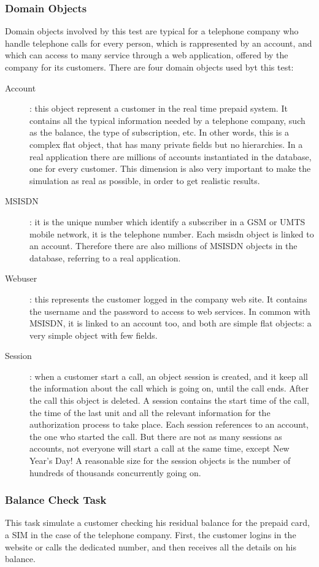 			\subsubsection{Domain Objects}
Domain objects involved by this test are typical for a telephone company who handle telephone calls for every person, which is rappresented by an account, and which can access to many service through a web application, offered by the company for its customers. There are four domain objects used byt this test:
\begin{description}
	\item[Account]: this object represent a customer in the real time prepaid system. It contains all the typical information needed by a telephone company, such as the balance, the type of subscription, etc. In other words, this is a complex flat object, that has many private fields but no hierarchies. In a real application there are millions of accounts instantiated in the database, one for every customer. This dimension is also very important to make the simulation as real as possible, in order to get realistic results.
	\item[MSISDN]: it is the unique number which identify a subscriber in a GSM or UMTS mobile network, it is the telephone number. Each msisdn object is linked to an account. Therefore there are also millions of MSISDN objects in the database, referring to a real application.
	\item[Webuser]: this represents the customer logged in the company web site. It contains the username and the password to access to web services. In common with MSISDN, it is linked to an account too, and both are simple flat objects: a very simple object with few fields.
	\item[Session]: when a customer start a call, an object session is created, and it keep all the information about the call which is going on, until the call ends. After the call this object is deleted. A session contains the start time of the call, the time of the last unit and all the relevant information for the authorization process to take place. Each session references to an account, the one who started the call. But there are not as many sessions as accounts, not everyone will start a call at the same time, except New Year's Day! A reasonable size for the session objects is the number of hundreds of thousands concurrently going on.
\end{description}

			\subsubsection{Balance Check Task}
This task simulate a customer checking his residual balance for the prepaid card, a SIM in the case of the telephone company. First, the customer logins in the website or calls the dedicated number, and then receives all the details on his balance.

